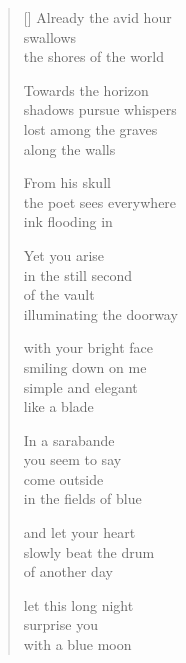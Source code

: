 \documentclass[12pt,a4paper]{article}
\begin{document}
\begin{verse}[\versewidth]
  Already the avid hour \\
  swallows \\
  the shores of the world

  Towards the horizon \\
  shadows pursue whispers \\
  lost among the graves \\
  along the walls

  From his skull \\
  the poet sees everywhere \\
  ink flooding in

  Yet you arise \\
  in the still second \\
  of the vault \\
  illuminating the doorway

  with your bright face \\
  smiling down on me \\
  simple and elegant \\
  like a blade

  In a sarabande \\
  you seem to say \\
  come outside \\
  in the fields of blue

  and let your heart \\
  slowly beat the drum \\
  of another day

  let this long night \\
  surprise you \\
  with a blue moon
\end{verse}


\newpage

\poemtitle{}

\settowidth{\versewidth}{my lips still reach for the heavens}

\bigskip
\end{document}
